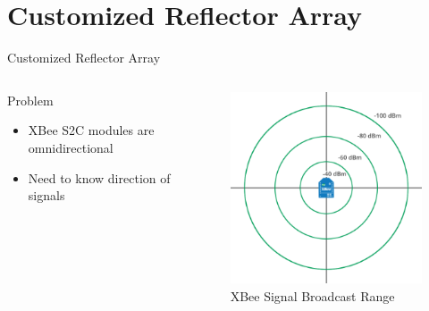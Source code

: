 \documentclass{beamer}
\begin{document}

\section{Customized Reflector Array}

\begin{frame}{Customized Reflector Array}
  \begin{columns}
      \begin{block}{Problem}
        \begin{itemize}
          \item XBee S2C modules are omnidirectional
          \item Need to know direction of signals
        \end{itemize}
      \end{block}
     \begin{figure}
    	\centering
    	\includegraphics[height=0.5\textheight]{figs/img/XBee_signal.png}
    	\caption{XBee Signal Broadcast Range}
    	\label{fig:XBeeSignal}
  	  \end{figure}
  \end{columns}
\end{frame}
\end{document}
